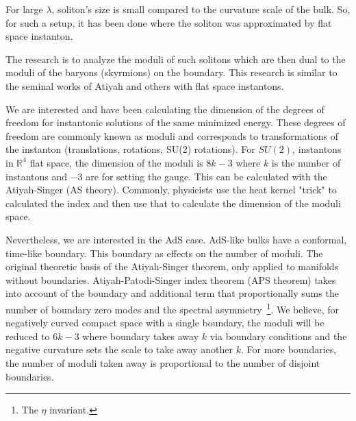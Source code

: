 \documentclass[12pt]{article}
\begin{document}
For large $\lambda$, soliton's size is small compared to the curvature scale of the bulk. 
So, for such a setup, it has been done where the soliton was approximated by flat space instanton.


The research is to analyze the moduli of such solitons which are then dual to the moduli of the baryons (skyrmions) on the boundary.
This research is similar to the seminal works of Atiyah and others with flat space instantons.

We are interested and have been calculating the dimension of the degrees of freedom for instantonic solutions of the same minimized energy.
These degrees of freedom are commonly known as moduli and corresponds to transformations of the instanton (translations, rotations, SU(2) rotations).
For $SU(2)$, instantons in $\mathds{R}^4$ flat space, the dimension of the moduli is $8k - 3$ where $k$ is the number of instantons and $-3$ are for setting the gauge.
This can be calculated with the Atiyah-Singer (AS theory).
Commonly, physicists use the heat kernel "trick" to calculated the index and then use that to calculate the dimension of the moduli space.

Nevertheless, we are interested in the AdS case. 
AdS-like bulks have a conformal, time-like boundary.
This boundary as effects on the number of moduli.
The original theoretic basis of the Atiyah-Singer theorem, only applied to manifolds without boundaries. 
Atiyah-Patodi-Singer index theorem (APS theorem) takes into account of the boundary and additional term that proportionally sums the number of boundary zero modes and the spectral asymmetry\
  \footnote{The $\eta$ invariant.}.
We believe, for negatively curved compact space with a single boundary, the moduli will be reduced to $6k - 3$ where boundary takes away $k$ via boundary conditions and the negative curvature sets the scale to take away another $k$.
For more boundaries, the number of moduli taken away is proportional to the number of disjoint boundaries.
\end{document}

